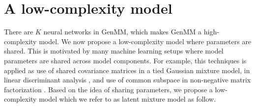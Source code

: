 
\section{A low-complexity model}
There are $K$ neural networks in GenMM, which makes GenMM a high-complexity model.
We now propose a low-complexity model where parameters are shared. This is motivated by many machine learning setups where model parameters are shared across model components. For example, this techniques is applied as use of shared covariance matrices in a tied Gaussian mixture model, in linear discriminant analysis \cite{bellegarda1990tiedmixture, Kimball:1993:UTD:1075671.1075694, Bishop:2006:PRM:1162264}, and use of common subspace in non-negative matrix factorization \cite{Gupta2013}. Based on the idea of sharing parameters, we propose a low-complexity model which we refer to as latent mixture model as follow.

